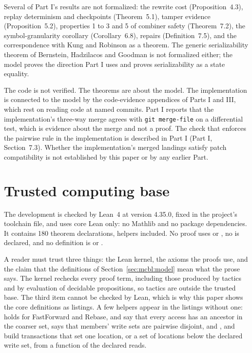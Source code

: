 \documentclass[11pt,letterpaper]{article}
\theoremstyle{definition}
\theoremstyle{remark}
\begin{document}
Several of Part I's results are not formalized: the rewrite cost (Proposition~4.3), replay determinism and checkpoints (Theorem~5.1), tamper evidence (Proposition~5.2), properties 1 to 3 and 5 of combiner safety (Theorem~7.2), the symbol-granularity corollary (Corollary~6.8), repairs (Definition~7.5), and the correspondence with Kung and Robinson \cite{kung1981occ} as a theorem. The generic serializability theorem of Bernstein, Hadzilacos and Goodman \cite{bhg1987} is not formalized either; the model proves the direction Part I uses and proves serializability as a state equality.

The code is not verified. The theorems are about the model. The implementation is connected to the model by the code-evidence appendices of Parts I and III, which rest on reading code at named commits. Part I reports that the implementation's three-way merge agrees with \texttt{\small git merge-file} on a differential test, which is evidence about the merge and not a proof. The check that enforces the pairwise rule in the implementation is described in Part I (Part I, Section~7.3). Whether the implementation's merged landings satisfy patch compatibility is not established by this paper or by any earlier Part.

\section{Trusted computing base}
\label{sec:mcbl:tcb}

The development is checked by Lean~4 at version 4.35.0, fixed in the project's toolchain file, and uses core Lean only: no Mathlib and no package dependencies. It contains 180 theorem declarations, helpers included. No proof uses  or , no  is declared, and no definition is  or .

A reader must trust three things: the Lean kernel, the axioms the proofs use, and the claim that the definitions of Section~\ref{sec:mcbl:model} mean what the prose says. The kernel rechecks every proof term, including those produced by tactics and by evaluation of decidable propositions, so tactics are outside the trusted base. The third item cannot be checked by Lean, which is why this paper shows the core definitions as listings. A few helpers appear in the listings without one:  holds for FastForward and Rebase,  and  say that every access has an ancestor in the coarser set,  says that members' write sets are pairwise disjoint, and ,  and  build transactions that set one location, or a set of locations below the declared write set, from a function of the declared reads.
\end{document}
